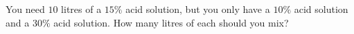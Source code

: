 You need $10$ litres of a $15\%$ acid solution, but you only have a $10\%$ acid solution and a $30\%$ acid solution. How many litres of each should you mix?
